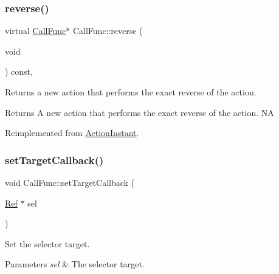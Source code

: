 \subsubsection{\texorpdfstring{reverse()}{reverse()}\hspace{0.1cm}{\footnotesize\ttfamily [2/2]}}
{\footnotesize\ttfamily virtual \hyperlink{classCallFunc}{Call\+Func}$\ast$ Call\+Func\+::reverse (\begin{DoxyParamCaption}\item[{void}]{ }\end{DoxyParamCaption}) const\hspace{0.3cm}{\ttfamily [override]}, {\ttfamily [virtual]}}

Returns a new action that performs the exact reverse of the action.

\begin{DoxyReturn}{Returns}
A new action that performs the exact reverse of the action.  NA 
\end{DoxyReturn}


Reimplemented from \hyperlink{classActionInstant_aeb1870802c509e1f4111c863a28e9262}{Action\+Instant}.

\mbox{\label{classCallFunc_af44a55cfb845edb38e1c7963e2a6646f}} 
\subsubsection{\texorpdfstring{set\+Target\+Callback()}{setTargetCallback()}\hspace{0.1cm}{\footnotesize\ttfamily [1/2]}}
{\footnotesize\ttfamily void Call\+Func\+::set\+Target\+Callback (\begin{DoxyParamCaption}\item[{\hyperlink{classRef}{Ref} $\ast$}]{sel }\end{DoxyParamCaption})\hspace{0.3cm}{\ttfamily [inline]}}

Set the selector target.


\begin{DoxyParams}{Parameters}
{\em sel} & The selector target. \\
\hline
\end{DoxyParams}
\mbox{\label{classCallFunc_af44a55cfb845edb38e1c7963e2a6646f}} 
